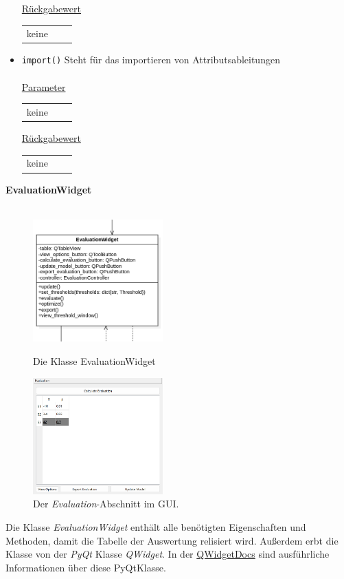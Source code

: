 \documentclass{article}
\begin{document}
\begin{itemize}
\underline{{Rückgabewert}}
\begin{tabular}{lll}
 keine \\
\end{tabular}
\item \texttt{import()} \newline Steht für das importieren von Attributsableitungen
\\\\
\underline{{Parameter}} 
\begin{tabular}{lll}
keine
\end{tabular}

\underline{{Rückgabewert}}
\begin{tabular}{lll}
keine
\end{tabular}
\end{itemize}

\newpage
\textbf{\large{EvaluationWidget}}\\\\
\begin{figure}[H]%
    \centering
    \begin{minipage}[b]{0.4\textwidth}
        \includegraphics[width=5cm]{entwurf/Entwurf_dokument/img/Alissa/EvaluationWidget.png}
        \caption{Die Klasse EvaluationWidget}
    \end{minipage}
    \hfill
    \begin{minipage}[b]{0.4\textwidth}
        \includegraphics[width=5cm]{entwurf/Entwurf_dokument/img/Alissa/evaluationGUI.png} 
    \caption{Der \textit{Evaluation}-Abschnitt im GUI.}
    \end{minipage}
\end{figure}
Die Klasse \textit{EvaluationWidget} enthält alle benötigten Eigenschaften und Methoden, damit die Tabelle der Auswertung relisiert wird. Außerdem erbt die Klasse von der \textit{PyQt} Klasse \textit{QWidget}. In der \href{https://doc.qt.io/qt-6/qwidget.html}{QWidget\textendash Docs} sind ausführliche Informationen über diese PyQt\textendash Klasse.
\newline \newline
\end{document}
